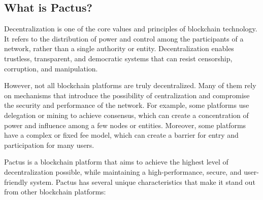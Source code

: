 \documentclass{novel}
\begin{document}
\subsection{What is Pactus?}
Decentralization is one of the core values and principles of blockchain technology. It refers to the distribution of power and control among the participants of a network, rather than a single authority or entity. Decentralization enables trustless, transparent, and democratic systems that can resist censorship, corruption, and manipulation.

However, not all blockchain platforms are truly decentralized. Many of them rely on mechanisms that introduce the possibility of centralization and compromise the security and performance of the network. For example, some platforms use delegation or mining to achieve consensus, which can create a concentration of power and influence among a few nodes or entities. Moreover, some platforms have a complex or fixed fee model, which can create a barrier for entry and participation for many users.

Pactus is a blockchain platform that aims to achieve the highest level of decentralization possible, while maintaining a high-performance, secure, and user-friendly system. Pactus has several unique characteristics that make it stand out from other blockchain platforms:
\end{document}
